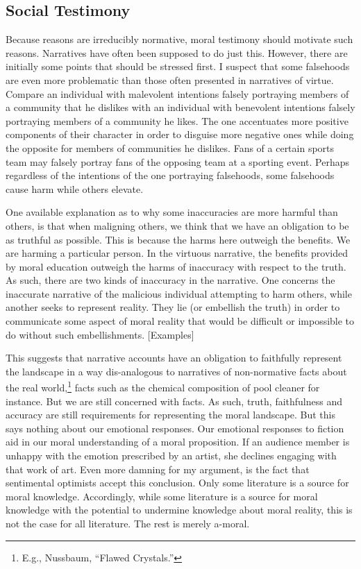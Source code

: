 \documentclass[phdthesis,12pt,final,a4paper]{wuthesis}
\theoremstyle{definition}
\theoremstyle{definition}
\theoremstyle{definition}
\theoremstyle{definition}
\theoremstyle{remark}
\begin{document}
\subsection*{Social Testimony}\label{social-testimony}

Because reasons are irreducibly normative, moral testimony should motivate such reasons. Narratives have often been supposed to do just this. However, there are initially some points that should be stressed first. I suspect that some falsehoods are even more problematic than those often presented in narratives of virtue. Compare an individual with malevolent intentions falsely portraying members of a community that he dislikes with an individual with benevolent intentions falsely portraying members of a community he likes. The one accentuates more positive components of their character in order to disguise more negative ones while doing the opposite for members of communities he dislikes. Fans of a certain sports team may falsely portray fans of the opposing team at a sporting event. Perhaps regardless of the intentions of the one portraying falsehoods, some falsehoods cause harm while others elevate.

One available explanation as to why some inaccuracies are more harmful than others, is that when maligning others, we think that we have an obligation to be as truthful as possible. This is because the harms here outweigh the benefits. We are harming a particular person. In the virtuous narrative, the benefits provided by moral education outweigh the harms of inaccuracy with respect to the truth. As such, there are two kinds of inaccuracy in the narrative. One concerns the inaccurate narrative of the malicious individual attempting to harm others, while another seeks to represent reality. They lie (or embellish the truth) in order to communicate some aspect of moral reality that would be difficult or impossible to do without such embellishments. {[}Examples{]}

This suggests that narrative accounts have an obligation to faithfully represent the landscape in a way dis-analogous to narratives of non-normative facts about the real world,\footnote{E.g., Nussbaum, {``Flawed {Crystals}.''}} facts such as the chemical composition of pool cleaner for instance. But we are still concerned with facts. As such, truth, faithfulness and accuracy are still requirements for representing the moral landscape. But this says nothing about our emotional responses. Our emotional responses to fiction aid in our moral understanding of a moral proposition. If an audience member is unhappy with the emotion prescribed by an artist, she declines engaging with that work of art. Even more damning for my argument, is the fact that sentimental optimists accept this conclusion. Only some literature is a source for moral knowledge. Accordingly, while some literature is a source for moral knowledge with the potential to undermine knowledge about moral reality, this is not the case for all literature. The rest is merely a-moral.
\end{document}
